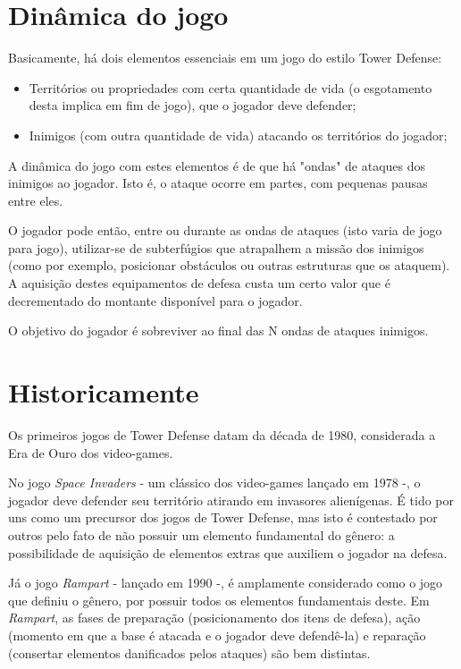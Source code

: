 \documentclass[rel_mlp]{iiufrgs}
\begin{document}

\section{Dinâmica do jogo}

Basicamente, há dois elementos essenciais em um jogo do estilo Tower Defense:

\begin{itemize}[leftmargin=3em]
\setlength{\itemindent}{1em}

    \item Territórios ou propriedades com certa quantidade de vida (o esgotamento desta implica em fim de jogo), que o jogador deve defender;

    \item Inimigos (com outra quantidade de vida) atacando os territórios do jogador;

\end{itemize}

A dinâmica do jogo com estes elementos é de que há "ondas" de ataques dos inimigos ao jogador. Isto é, o ataque ocorre em partes, com pequenas pausas entre eles.

O jogador pode então, entre ou durante as ondas de ataques (isto varia de jogo para jogo), utilizar-se de subterfúgios que atrapalhem a missão dos inimigos (como por exemplo, posicionar obstáculos ou outras estruturas que os ataquem). A aquisição destes equipamentos de defesa custa um certo valor que é decrementado do montante disponível para o jogador.

O objetivo do jogador é sobreviver ao final das N ondas de ataques inimigos.


\section{Historicamente}

Os primeiros jogos de Tower Defense datam da década de 1980, considerada a Era de Ouro dos video-games.

No jogo \textit{Space Invaders} - um clássico dos video-games lançado em 1978 -, o jogador deve defender seu território atirando em invasores alienígenas. É tido por uns como um precursor dos jogos de Tower Defense, mas isto é contestado por outros pelo fato de não possuir um elemento fundamental do gênero: a possibilidade de aquisição de elementos extras que auxiliem o jogador na defesa.

Já o jogo \textit{Rampart} - lançado em 1990 -, é amplamente considerado como o jogo que definiu o gênero, por possuir todos os elementos fundamentais deste. Em \textit{Rampart}, as fases de preparação (posicionamento dos itens de defesa), ação (momento em que a base é atacada e o jogador deve defendê-la) e reparação (consertar elementos danificados pelos ataques) são bem distintas.
\end{document}
